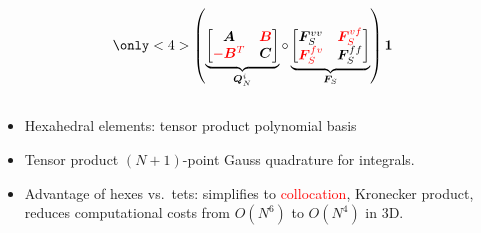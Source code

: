 \documentclass[compress]{beamer}
\theoremstyle{plain}
\newcommand{\LRp}[1]{\left( #1 \right)}
\renewcommand{\note}[1]{\textcolor{red}{{#1}}}
\begin{document}
{\begin{columns}
\begin{column}{.51\textwidth}
\[{}
\only<4>{
\LRp{\underbrace{\begin{bmatrix}
\bm{A} & \note{\bm{B}}\\
\note{-\bm{B}^T} & \bm{C}
\end{bmatrix}}_{\bm{Q}_N^i} \circ
\underbrace{\begin{bmatrix}
\bm{F}^{vv}_S & \note{\bm{F}^{vf}_S}\\
\note{\bm{F}^{fv}_S} & \bm{F}^{ff}_S
\end{bmatrix}}_{\bm{F}_S} } \bm{1}
}
\]
\end{column}
\end{columns}
\vspace{.5em}
\begin{itemize}
\item Hexahedral elements: tensor product polynomial basis
\vspace{.5em}
\item Tensor product $(N+1)$-point Gauss quadrature for integrals.
\vspace{.5em}
\item Advantage of hexes vs.\ tets: simplifies to \note{collocation}, Kronecker product, reduces computational costs from $O(N^6)$ to $O(N^4)$ in 3D.
\vspace{.5em}
\end{itemize} 
}
\end{document}
